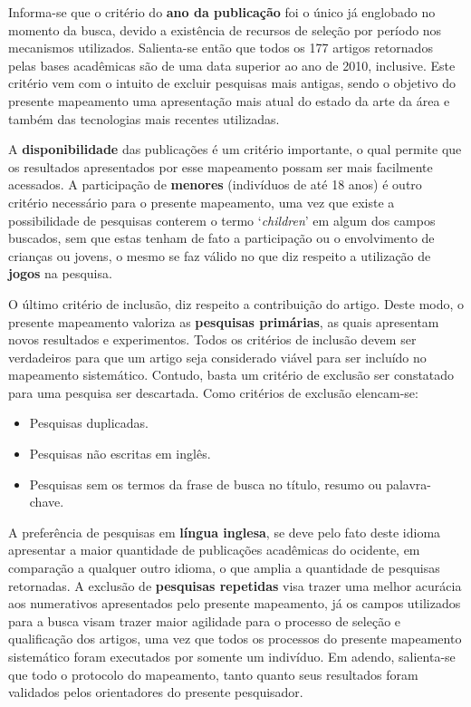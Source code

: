 \documentclass[12pt]{article}
\begin{document}
Informa-se que o critério do \textbf{ano da publicação} foi o único já englobado no momento da busca, devido a existência de recursos de seleção por período nos mecanismos utilizados. Salienta-se então que todos os 177 artigos retornados pelas bases acadêmicas são de uma data superior ao ano de 2010, inclusive. Este critério vem com o intuito de excluir pesquisas mais antigas, sendo o objetivo do presente mapeamento uma apresentação mais atual do estado da arte da área e também das tecnologias mais recentes utilizadas. 

A \textbf{disponibilidade} das publicações é um critério importante, o qual permite que os resultados apresentados por esse mapeamento possam ser mais facilmente acessados. A participação de \textbf{menores} (indivíduos de até 18 anos) é outro critério necessário para o presente mapeamento, uma vez que existe a possibilidade de pesquisas conterem o termo `\textit{children}' em algum dos campos buscados, sem que estas tenham de fato a participação ou o envolvimento de crianças ou jovens, o mesmo se faz válido no que diz respeito a utilização de \textbf{jogos} na pesquisa. 

O último critério de inclusão, diz respeito a contribuição do artigo. Deste modo, o presente mapeamento valoriza as \textbf{pesquisas primárias}, as quais apresentam novos resultados e experimentos. Todos os critérios de inclusão devem ser verdadeiros para que um artigo seja considerado viável para ser incluído no mapeamento sistemático. Contudo, basta um critério de exclusão ser constatado para uma pesquisa ser descartada. Como critérios de exclusão elencam-se: 

\begin{itemize}
    \item Pesquisas duplicadas.
    \item Pesquisas não escritas em inglês.
    \item Pesquisas sem os termos da frase de busca no título, resumo ou palavra-chave.
\end{itemize}

A preferência de pesquisas em \textbf{língua inglesa}, se deve pelo fato deste idioma apresentar a maior quantidade de publicações acadêmicas do ocidente, em comparação a qualquer outro idioma, o que amplia a quantidade de pesquisas retornadas. A exclusão de \textbf{pesquisas repetidas} visa trazer uma melhor acurácia aos numerativos apresentados pelo presente mapeamento, já os campos utilizados para a busca visam trazer maior agilidade para o processo de seleção e qualificação dos artigos, uma vez que todos os processos do presente mapeamento sistemático foram executados por somente um indivíduo. Em adendo, salienta-se que todo o protocolo do mapeamento, tanto quanto seus resultados foram validados pelos orientadores do presente pesquisador. 
\end{document}
